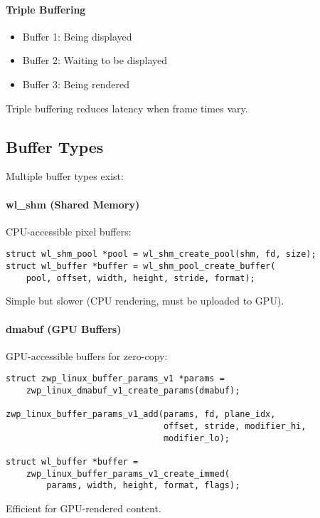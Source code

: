 \paragraph{Triple Buffering}
\begin{itemize}
    \item Buffer 1: Being displayed
    \item Buffer 2: Waiting to be displayed
    \item Buffer 3: Being rendered
\end{itemize}

Triple buffering reduces latency when frame times vary.

\subsection{Buffer Types}

Multiple buffer types exist:

\paragraph{wl\_shm (Shared Memory)}
CPU-accessible pixel buffers:
\begin{lstlisting}[style=cstyle, caption=Shared Memory Buffer]
struct wl_shm_pool *pool = wl_shm_create_pool(shm, fd, size);
struct wl_buffer *buffer = wl_shm_pool_create_buffer(
    pool, offset, width, height, stride, format);
\end{lstlisting}

Simple but slower (CPU rendering, must be uploaded to GPU).

\paragraph{dmabuf (GPU Buffers)}
GPU-accessible buffers for zero-copy:
\begin{lstlisting}[style=cstyle, caption=DMA-BUF]
struct zwp_linux_buffer_params_v1 *params =
    zwp_linux_dmabuf_v1_create_params(dmabuf);

zwp_linux_buffer_params_v1_add(params, fd, plane_idx,
                               offset, stride, modifier_hi,
                               modifier_lo);

struct wl_buffer *buffer =
    zwp_linux_buffer_params_v1_create_immed(
        params, width, height, format, flags);
\end{lstlisting}

Efficient for GPU-rendered content.

